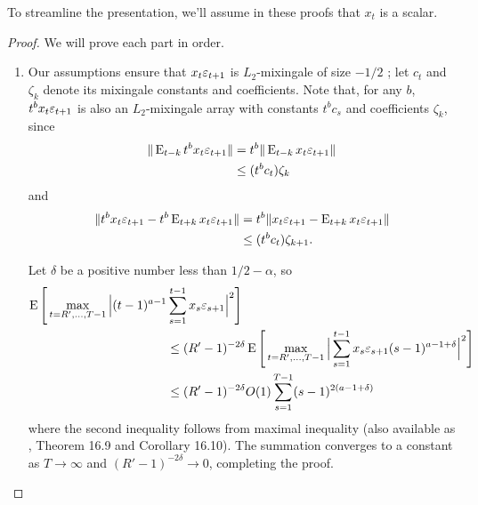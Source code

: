 \documentclass[12pt,fleqn]{article}
\begin{document}
\noindent%
To streamline the
presentation, we'll assume in these proofs that $x_t$ is a scalar.
\begin{proof}
  We will prove each part in order.
  \begin{enumerate}
  \item Our assumptions ensure that $x_t \varepsilon_{t+1}$ is $L_2$-mixingale
    of size $-1/2$ \citep[see Theorem 17.5 of][]{Dav:94}; let $c_t$
    and $\zeta_k$ denote its mixingale
    constants and coefficients. Note that, for any $b$, $t^{b} x_t \varepsilon_{t+1}$ is
    also an $L_2$-mixingale array with constants $t^{b} c_s$ and
    coefficients $\zeta_k$, since
    \begin{align*}
      \| \operatorname{E}_{t-k} t^{b} x_t \varepsilon_{t+1} \| &= t^{b} \| \operatorname{E}_{t-k} x_t \varepsilon_{t+1} \| \\
      &\leq (t^{b} c_t) \zeta_k
    \end{align*}
    and
    \begin{align*}
      \| t^{b} x_t \varepsilon_{t+1} - t^{b} \operatorname{E}_{t+k} x_t \varepsilon_{t+1} \| &= t^{b} \|  x_t \varepsilon_{t+1} - \operatorname{E}_{t+k} x_t \varepsilon_{t+1} \| \\
      &\leq (t^{b} c_t) \zeta_{k+1}.
    \end{align*}

    Let $\delta$ be a positive number less than $1/2 - \alpha$, so
    \begin{align*}
      \operatorname{E}\Bigg[\max_{t=R',\dots,T-1} \Big|(t-1)^{a-1} & \sum_{s=1}^{t-1} x_s \varepsilon_{s+1} \Big|^2\Bigg] \\
      &\leq (R'-1)^{-2\delta} \operatorname{E}\Bigg[\max_{t=R',\dots,T-1} \Big| \sum_{s=1}^{t-1} x_s \varepsilon_{s+1} (s-1)^{a-1+\delta} \Big|^2\Bigg] \\
      &\leq (R'-1)^{-2\delta} O(1) \sum_{s=1}^{T-1} (s-1)^{2(a - 1 + \delta)}
    \end{align*}
    where the second inequality follows from  maximal
    inequality (also available as \citealp{Dav:94}, Theorem 16.9 and
    Corollary 16.10). The summation converges to a constant as $T \to
    \infty$ and $(R'-1)^{-2\delta} \to 0$, completing the proof.


\end{enumerate}
\end{proof}
\end{document}
